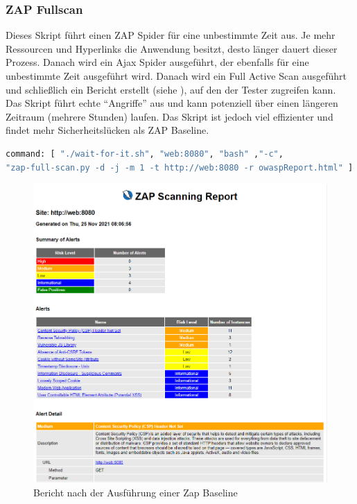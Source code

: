 \subsubsection{ZAP Fullscan}


Dieses Skript führt einen ZAP Spider für eine unbestimmte Zeit aus.
Je mehr Ressourcen und Hyperlinks die Anwendung besitzt, desto länger
dauert dieser Prozess. Danach wird ein Ajax Spider ausgeführt, der
ebenfalls für eine unbestimmte Zeit ausgeführt wird. Danach wird ein
Full Active Scan ausgeführt und schließlich ein Bericht erstellt
(siehe ), auf  den der Tester zugreifen kann.
Das Skript führt echte ``Angriffe'' aus  und kann potenziell über einen
längeren Zeitraum (mehrere Stunden) laufen. Das Skript ist jedoch viel
effizienter und findet mehr  Sicherheitslücken als ZAP Baseline.

\begin{lstlisting}[language=Dockerfile,label={lst:fullscan},caption={ZAP Fullscan Ausführungsbefehl}]
command: [ "./wait-for-it.sh", "web:8080", "bash" ,"-c",
"zap-full-scan.py -d -j -m 1 -t http://web:8080 -r owaspReport.html" ]

\end{lstlisting}


\begin{figure}[H]
    \centering
    \includegraphics[scale=0.5]{images/zap-report}
    \caption{Bericht nach der Ausführung einer Zap Baseline} \label{fig:baseline}
\end{figure}
